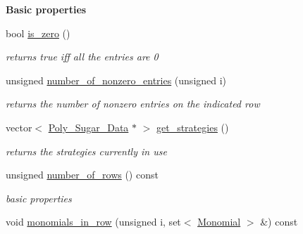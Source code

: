 \begin{Indent}\textbf{ Basic properties}\par
\begin{DoxyCompactItemize}
\item 
\mbox{\label{group___g_b_computation_aee8c1358071a26e60b2e50f9678dcfb0}} 
bool \hyperlink{group___g_b_computation_aee8c1358071a26e60b2e50f9678dcfb0}{is\+\_\+zero} ()
\begin{DoxyCompactList}\small\item\em returns {\ttfamily true} iff all the entries are 0 \end{DoxyCompactList}\item 
\mbox{\label{group___g_b_computation_a4ab787b92eb2f66d529d7ecf6d5942bb}} 
unsigned \hyperlink{group___g_b_computation_a4ab787b92eb2f66d529d7ecf6d5942bb}{number\+\_\+of\+\_\+nonzero\+\_\+entries} (unsigned i)
\begin{DoxyCompactList}\small\item\em returns the number of nonzero entries on the indicated row \end{DoxyCompactList}\item 
\mbox{\label{group___g_b_computation_a1e58764d1bee3437e2bfa74fbb847b1a}} 
vector$<$ \hyperlink{group__strategygroup_class_poly___sugar___data}{Poly\+\_\+\+Sugar\+\_\+\+Data} $\ast$ $>$ \hyperlink{group___g_b_computation_a1e58764d1bee3437e2bfa74fbb847b1a}{get\+\_\+strategies} ()
\begin{DoxyCompactList}\small\item\em returns the strategies currently in use \end{DoxyCompactList}\item 
\mbox{\label{group___g_b_computation_afe2aa558df25088c0b184134deaf0ee2}} 
unsigned \hyperlink{group___g_b_computation_afe2aa558df25088c0b184134deaf0ee2}{number\+\_\+of\+\_\+rows} () const
\begin{DoxyCompactList}\small\item\em basic properties \end{DoxyCompactList}\item 
\mbox{\label{group___g_b_computation_a199285ca97ceba99fced77bb368681e1}} 
void \hyperlink{group___g_b_computation_a199285ca97ceba99fced77bb368681e1}{monomials\+\_\+in\+\_\+row} (unsigned i, set$<$ \hyperlink{group__polygroup_class_monomial}{Monomial} $>$ \&) const

\end{DoxyCompactItemize}
\end{Indent}
